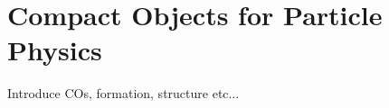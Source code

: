 \graphicspath{{img/chapter_2/}}

\chapter{Compact Objects for Particle Physics}
\label{chapter:compactobjects}

\begin{synopsis}
  Introduce COs, formation, structure etc...  
\end{synopsis}
